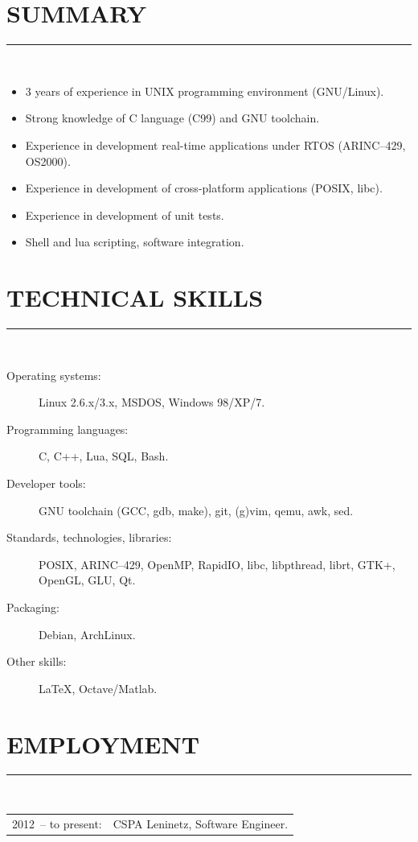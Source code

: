 \documentclass[a4paper,oneside,12pt]{article}
\newcommand{\cvpart}[1]{%
\vspace{-0.9em}%
\section*{\Large\bfseries\MakeTextUppercase{#1}}%
\vspace{-1.7em}%
\rule{\linewidth}{0.3em}\\[-0.8em]%
}
\begin{document}
\cvpart{Summary}
\begin{itemize}
\item 3 years of experience in UNIX programming environment (GNU/Linux).
\item Strong knowledge of C language (C99) and GNU toolchain.
\item Experience in development real-time applications under RTOS (ARINC--429, OS2000).
\item Experience in development of cross-platform applications (POSIX, libc).
\item Experience in development of unit tests.
\item Shell and lua scripting, software integration.
\end{itemize}


\cvpart{Technical skills}
\begin{description}
\item[Operating systems:] Linux 2.6.x/3.x, MSDOS, Windows 98/XP/7.
\item[Programming languages:] C, C++, Lua, SQL, Bash. 
\item[Developer tools:] GNU toolchain (GCC, gdb, make), git, (g)vim, qemu, awk, sed.
\item[Standards, technologies, libraries:] POSIX, ARINC--429, OpenMP, RapidIO, libc, libpthread, librt, GTK+, OpenGL, GLU, Qt. 
\item[Packaging:] Debian, ArchLinux.
\item[Other skills:]  LaTeX, Octave/Matlab.
\end{description}


\cvpart{Employment}

\begin{tabularx}{\linewidth}{lX}
2012~-- to present:& CSPA Leninetz, Software Engineer.\\
\end{tabularx}
\end{document}

